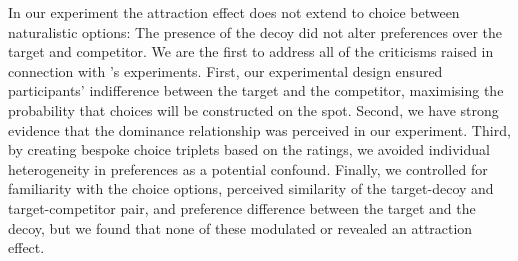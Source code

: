 \documentclass[12pt, a4paper]{article}
\begin{document}
In our experiment the attraction effect does not extend to choice between naturalistic options: The presence of the decoy did not alter preferences over the target and competitor. We are the first to address all of the criticisms raised in connection with \citeauthor{Frederick2014}'s experiments. First, our experimental design ensured participants' indifference between the target and the competitor, maximising the probability that choices will be constructed on the spot. Second, we have strong evidence that the dominance relationship was perceived in our experiment. Third, by creating bespoke choice triplets based on the ratings, we avoided individual heterogeneity in preferences as a potential confound. Finally, we controlled for familiarity with the choice options, perceived similarity of the target-decoy and target-competitor pair, and preference difference between the target and the decoy, but we found that none of these modulated or revealed an attraction effect.




\newpage



\newpage

\theendnotes

\clearpage
\end{document}
